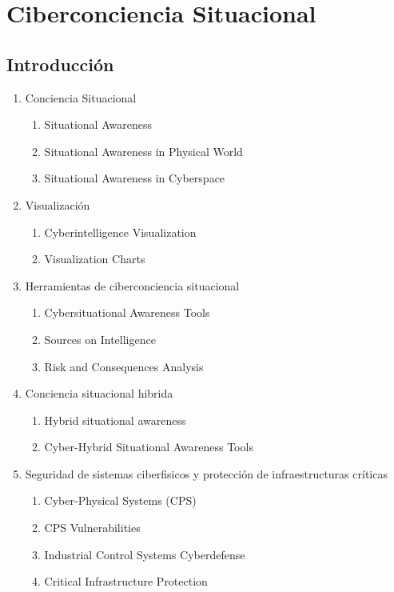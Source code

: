 \chapter{Ciberconciencia Situacional}


\section{Introducción}
\begin{enumerate}
   \item Conciencia Situacional
   \begin{enumerate}
      \item Situational Awareness
      \item Situational Awareness in Physical World   
      \item Situational Awareness in Cyberspace
   \end{enumerate}
   \item Visualización
   \begin{enumerate}
      \item Cyberintelligence Visualization
      \item Visualization Charts
   \end{enumerate}
   \item Herramientas de ciberconciencia situacional
   \begin{enumerate}
      \item Cybersituational Awareness Tools
      \item Sources on Intelligence
      \item Risk and Consequences Analysis
   \end{enumerate}
   \item Conciencia situacional hibrida
   \begin{enumerate}
      \item Hybrid situational awareness
      \item Cyber-Hybrid Situational Awareness Tools
   \end{enumerate}
   \item Seguridad de sistemas ciberfisicos y protección de infraestructuras críticas
   \begin{enumerate}
      \item Cyber-Physical Systems (CPS)
      \item CPS Vulnerabilities
      \item Industrial Control Systems Cyberdefense
      \item Critical Infrastructure Protection
   \end{enumerate}
\end{enumerate}

